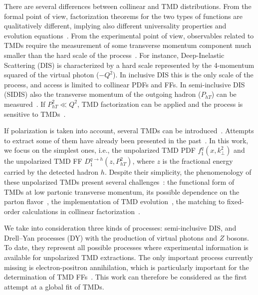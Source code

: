 \documentclass[aps,preprintnumbers,showpacs,nofootinbib,superscriptaddress,floatfix]{revtex4}
\newcommand{\T}{\perp}
\begin{document}
There are several differences between collinear and TMD distributions. From
the formal point of view, factorization theorems for the two types of
functions are qualitatively different, implying also different universality
properties and evolution equations~\cite{Rogers:2015sqa}. From the
experimental point 
of view, observables related to TMDs require the measurement of some transverse
momentum component much smaller than the hard scale of the
process~\cite{Bacchetta:2016ccz,Radici:2016hbh}.  For
instance, Deep-Inelastic Scattering (DIS) is characterized by a hard scale represented by the
4-momentum squared of the virtual photon ($-Q^2$). In inclusive DIS this is
the only scale of the process, and access is limited to collinear PDFs
and FFs. In semi-inclusive DIS (SIDIS) also the transverse momentum of the
outgoing  
hadron ($P_{hT}$) can be measured~\cite{Mulders:1995dh,Bacchetta:2006tn}. 
If $P_{hT}^2\ll Q^2$, TMD
factorization can be applied and the process is sensitive to
TMDs~\cite{Collins:2011zzd}. 


If polarization is taken into account, several TMDs can be
introduced~\cite{Mulders:1995dh,Boer:1997nt,%
Bacchetta:2000jk,%
Mulders:2000sh,%
Boer:2016xqr%
}. Attempts to extract some of them have already been presented in the past~\cite{Bacchetta:2011gx,Anselmino:2012aa,Echevarria:2014xaa,Anselmino:2016uie,%
Lu:2009ip,Barone:2015ksa,%
Lefky:2014eia,%
Anselmino:2013vqa,Kang:2015msa%
}.  In
this work, we focus on the simplest ones, i.e., the unpolarized TMD
PDF $f_1^q(x,k_{\T}^2)$ and the unpolarized TMD
FF $D_1^{q \to h}(z,P_{hT}^2)$, where $z$ is
  the fractional energy carried by the detected hadron $h$. Despite their
  simplicity, the phenomenology of these unpolarized TMDs present several
  challenges~\cite{Signori:2016lvd}: the functional form of TMDs at low
  partonic transverse momentum, its possible dependence on the parton
  flavor~\cite{Signori:2013mda}, the implementation of TMD
  evolution~\cite{Bacchetta:2015ora,Rogers:2015sqa}, the matching to
  fixed-order calculations in collinear
  factorization~\cite{Collins:2016hqq}. 

We take into consideration three kinds of processes: semi-inclusive DIS, and
Drell--Yan processes (DY) with the production of virtual photons and $Z$
bosons. To date, they represent 
all possible processes
  where experimental information is available for unpolarized TMD
  extractions. 
The only important
process currently missing is electron-positron annihilation, which is
particularly important for the determination of TMD
FFs~\cite{Bacchetta:2015ora}. This work can therefore be considered as the
first attempt at a global fit of TMDs.  
\end{document}
